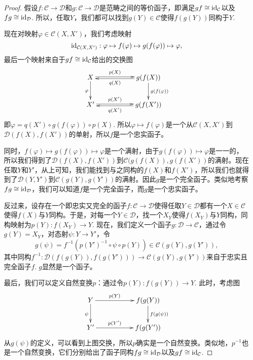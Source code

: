 \begin{proof}
假设$f:\mathcal{C}\to \mathcal{D}$和$g:\mathcal{C}\to \mathcal{D}$是范畴之间的等价函子，即满足$gf\cong \operatorname{id}_\mathcal{C}$以及$fg\cong \operatorname{id}_\mathcal{D}$. 所以，任取$Y$，我们都可以找到$g(Y)\in\mathcal{C}$使得$f(g(Y))$同构于$Y$.

现在对映射$\varphi\in \mathcal{C}(X,X')$，我们考虑映射
\[
	\operatorname{id}_{\mathcal{C}(X,X')}:\varphi\mapsto f(\varphi) \mapsto g(f(\varphi)) \mapsto \varphi,
\]
最后一个映射来自于$gf\cong \operatorname{id}_\mathcal{C}$给出的交换图
\[
\begin{xy}
	\xymatrix{
		X\ar@<0.3ex>[rr]^-{p(X)} \ar[d]_{\varphi}&&g(f(X)) \ar[d]^{g(f(\varphi))}\ar@<0.3ex>[ll]^-{q(X)}\\
		X'\ar@<0.3ex>[rr]^-{p(X')}&&g(f(X'))\ar@<0.3ex>[ll]^-{q(X')}
	}
\end{xy}
\]
即$\varphi=q(X') \circ g(f(\varphi))\circ p(X)$. 所以$\varphi\mapsto f(\varphi)$是一个从$\mathcal{C}(X,X')$到$\mathcal{D}(f(X),f(X'))$的单射，所以$f$是一个忠实函子。

同时，$f(\varphi) \mapsto g(f(\varphi)) \mapsto \varphi$是一个满射，由于$g(f(\varphi)) \mapsto \varphi$是一一的，所以我们得到了$\mathcal{D}(f(X),f(X'))$到$\mathcal{C}(g(f(X)),g(f(X'))$的满射。现在任取$Y$和$Y'$，从上可知，我们能找到与之同构的$f(X)$和$f(X')$，所以我们也就得到了$\mathcal{D}(Y,Y')$到$\mathcal{C}(g(Y),g(Y'))$的满射。因此$g$是一个完全函子。类似地考察$fg\cong \operatorname{id}_\mathcal{D}$，我们可以知道$f$是一个完全函子，而$g$是一个忠实函子。

反过来，设存在一个即忠实又完全的函子$f:\mathcal{C}\to \mathcal{D}$使得任取$Y\in\mathcal{D}$都有一个$X\in \mathcal{C}$使得$f(X)$与$Y$同构。于是，对每一个$Y\in \mathcal{D}$，找一个$X_Y$使得$f(X_Y)$与$Y$同构，同构映射为$p(Y):f(X_Y)\to Y$. 现在，我们定义一个函子$g:\mathcal{D}\to \mathcal{C}$，通过令$g(Y)=X_Y$，对态射$\psi:Y\to Y'$，令
\[
	g(\psi)=f^{-1}\left(p(Y')^{-1}\circ \psi \circ p(Y)\right)\in \mathcal{C}(g(Y),g(Y')),
\]
其中同构$f^{-1}:\mathcal{D}(f(g(Y)),f(g(Y')))\to \mathcal{C}(g(Y),g(Y'))$来自于忠实且完全函子$f$. $g$显然是一个函子。

最后，我们可以定义自然变换$p$：通过令$p(Y):f(g(Y))\to Y$. 此时，考虑图
\[
\begin{xy}
	\xymatrix{
		Y\ar[rr]^-{p(Y)} \ar[d]_{\psi}&&f(g(Y)) \ar[d]^{f(g(\psi))}\\
		Y'\ar[rr]^-{p(Y')}&&f(g(Y'))
	}
\end{xy}
\]
从$g(\psi)$的定义，可以看到上图交换，所以$p$确实是一个自然变换。类似地，$p^{-1}$也是一个自然变换，它们分别给出了函子同构$fg\cong \operatorname{id}_\mathcal{D}$以及$gf\cong \operatorname{id}_\mathcal{C}$.
\end{proof}

